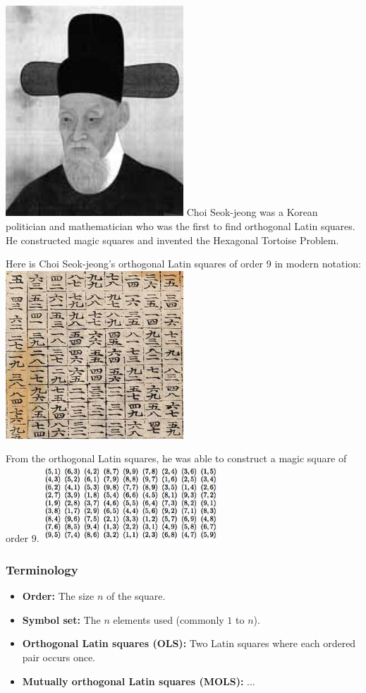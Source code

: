 \documentclass{beamer}
\begin{document}
\begin{frame}
\includegraphics[width=0.5\textwidth]{img12}
Choi Seok-jeong was a Korean politician and mathematician who was the first to find orthogonal Latin squares. He constructed magic squares and invented the Hexagonal Tortoise Problem.

Here is Choi Seok-jeong's orthogonal Latin squares of order 9 in modern notation:
\includegraphics[width=0.5\textwidth]{img10}

From the orthogonal Latin squares, he was able to construct a magic square of order 9.
\includegraphics[width=0.5\textwidth]{img11}
\end{frame}

\begin{frame}
\frametitle{Terminology}
\begin{itemize}
  \item \textbf{Order:} The size $n$ of the square.
  \item \textbf{Symbol set:} The $n$ elements used (commonly $1$ to $n$).
  \item \textbf{Orthogonal Latin squares (OLS):} Two Latin squares where each ordered pair occurs once.
  \item \textbf{Mutually orthogonal Latin squares (MOLS):} ...
\end{itemize}
\end{frame}
\end{document}
